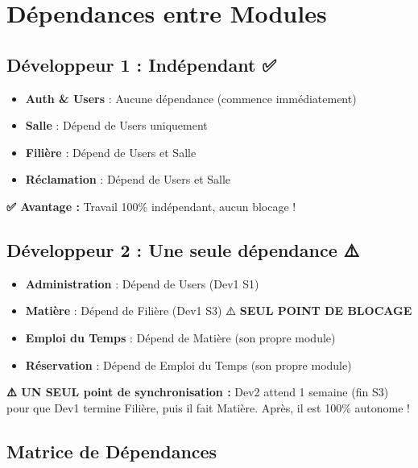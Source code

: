 \documentclass[12pt,a4paper]{article}
\begin{document}
\newpage

\section{Dépendances entre Modules}

\subsection{Développeur 1 : Indépendant ✅}

\begin{itemize}
    \item \textbf{Auth \& Users} : Aucune dépendance (commence immédiatement)
    \item \textbf{Salle} : Dépend de Users uniquement
    \item \textbf{Filière} : Dépend de Users et Salle
    \item \textbf{Réclamation} : Dépend de Users et Salle
\end{itemize}

\textbf{✅ Avantage :} Travail 100\% indépendant, aucun blocage !

\subsection{Développeur 2 : Une seule dépendance ⚠️}

\begin{itemize}
    \item \textbf{Administration} : Dépend de Users (Dev1 S1)
    \item \textbf{Matière} : Dépend de Filière (Dev1 S3) ⚠️ \textbf{SEUL POINT DE BLOCAGE}
    \item \textbf{Emploi du Temps} : Dépend de Matière (son propre module)
    \item \textbf{Réservation} : Dépend de Emploi du Temps (son propre module)
\end{itemize}

\textbf{⚠️ UN SEUL point de synchronisation :} Dev2 attend 1 semaine (fin S3) pour que Dev1 termine Filière, puis il fait Matière. Après, il est 100\% autonome !

\subsection{Matrice de Dépendances}
\end{document}
